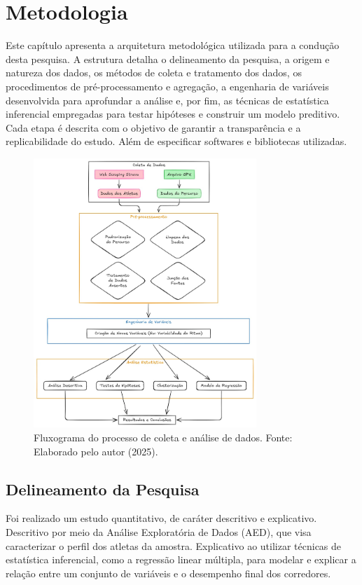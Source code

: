 \chapter{Metodologia}
\label{chap:metodologia}
Este capítulo apresenta a arquitetura metodológica utilizada para a condução desta pesquisa. A estrutura detalha o delineamento da pesquisa, a origem e natureza dos dados, os métodos de coleta e tratamento dos dados, os procedimentos de pré-processamento e agregação, a engenharia de variáveis desenvolvida para aprofundar a análise e, por fim, as técnicas de estatística inferencial empregadas para testar hipóteses e construir um modelo preditivo. Cada etapa é descrita com o objetivo de garantir a transparência e a replicabilidade do estudo. Além de especificar softwares e bibliotecas utilizadas.

\begin{figure}[h!]
    \centering
    \includegraphics[width=0.75\textwidth]{Imagens/fluxo_trabalho.png}
    \caption{Fluxograma do processo de coleta e análise de dados. Fonte: Elaborado pelo autor (2025).}
    \label{fig:fluxograma}
\end{figure}

\section{Delineamento da Pesquisa}

Foi realizado um estudo quantitativo, de caráter descritivo e explicativo. Descritivo por meio da Análise Exploratória de Dados (AED), que visa caracterizar o perfil dos atletas da amostra. Explicativo ao utilizar técnicas de estatística inferencial, como a regressão linear múltipla, para modelar e explicar a relação entre um conjunto de variáveis e o desempenho final dos corredores.

